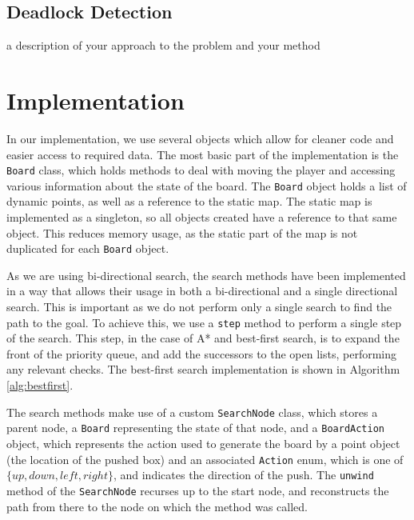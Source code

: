 \documentclass[a4paper,11pt]{article}
\begin{document}
\subsection{Deadlock Detection}
a description of your approach to the problem and your method
\section{Implementation}
In our implementation, we use several objects which allow for cleaner code and easier access to required data. The most basic part of the implementation is the \texttt{Board} class, which holds methods to deal with moving the player and accessing various information about the state of the board. The \texttt{Board} object holds a list of dynamic points, as well as a reference to the static map. The static map is implemented as a singleton, so all objects created have a reference to that same object. This reduces memory usage, as the static part of the map is not duplicated for each \texttt{Board} object.

As we are using bi-directional search, the search methods have been implemented in a way that allows their usage in both a bi-directional and a single directional search. This is important as we do not perform only a single search to find the path to the goal. To achieve this, we use a \texttt{step} method to perform a single step of the search. This step, in the case of A* and best-first search, is to expand the front of the priority queue, and add the successors to the open lists, performing any relevant checks. The best-first search implementation is shown in Algorithm \ref{alg:bestfirst}.

The search methods make use of a custom \texttt{SearchNode} class, which stores a parent node, a \texttt{Board} representing the state of that node, and a \texttt{BoardAction} object, which represents the action used to generate the board by a point object (the location of the pushed box) and an associated \texttt{Action} enum, which is one of $\{up, down, left, right\}$, and indicates the direction of the push. The \texttt{unwind} method of the \texttt{SearchNode} recurses up to the start node, and reconstructs the path from there to the node on which the method was called.
\begin{algorithm}
  \DontPrintSemicolon
  
  }
\caption{Best-first search}
\label{alg:bestfirst}
\end{algorithm}
\end{document}
